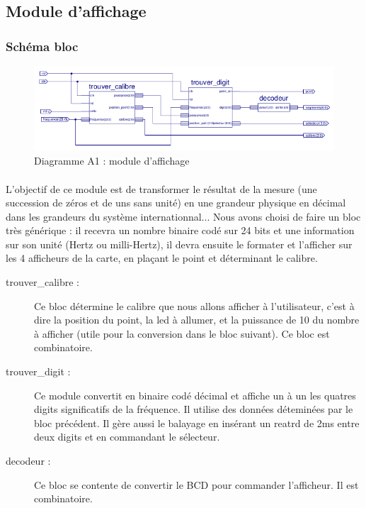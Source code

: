 \documentclass[a4paper,11pt]{article}
\begin{document}
\subsection{Module d'affichage}
  \subsubsection{Schéma bloc}
  
  \begin{figure}[H]
\begin{center}
	\includegraphics[scale=.9]{sch-afficheur.png}
	\caption{Diagramme A1 : module d'affichage}
\end{center}
\end{figure}

\paragraph{} L'objectif de ce module est de transformer le résultat de la mesure (une succession de zéros et de uns sans unité) 
en une grandeur physique en décimal dans les grandeurs du système internationnal... Nous avons choisi de faire un bloc très générique : 
il recevra un nombre binaire codé sur 24 bits et une information sur son unité (Hertz ou milli-Hertz), il devra ensuite le formater 
et l'afficher sur les 4 afficheurs de la carte, en plaçant le point et déterminant le calibre.

\begin{description}
  \item[trouver\_calibre : ] Ce bloc détermine le calibre que nous allons afficher à l'utilisateur, c'est à dire la position du point, la
  led à allumer, et la puissance de 10 du nombre à afficher (utile pour la conversion dans le bloc suivant). Ce bloc est combinatoire.
  \item[trouver\_digit : ] Ce module convertit en binaire codé décimal et affiche un à un les quatres digits significatifs de la fréquence. 
  Il utilise des données déteminées par le bloc précédent. Il gère aussi le balayage en insérant un reatrd de 2ms entre deux digits et 
  en commandant le sélecteur.
  \item[decodeur : ] Ce bloc se contente de convertir le BCD pour commander l'afficheur. Il est combinatoire.
\end{description}
\end{document}
